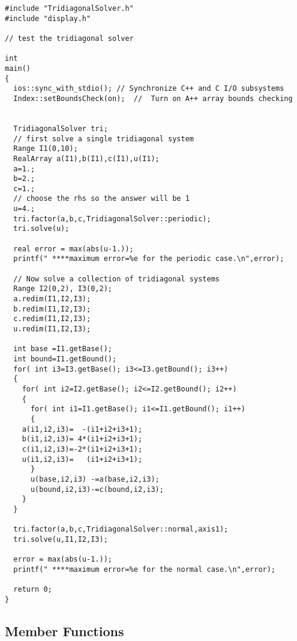 {\footnotesize
\begin{verbatim}
#include "TridiagonalSolver.h"
#include "display.h"

// test the tridiagonal solver

int
main()
{
  ios::sync_with_stdio(); // Synchronize C++ and C I/O subsystems
  Index::setBoundsCheck(on);  //  Turn on A++ array bounds checking


  TridiagonalSolver tri;
  // first solve a single tridiagonal system
  Range I1(0,10);
  RealArray a(I1),b(I1),c(I1),u(I1);
  a=1.;
  b=2.;
  c=1.;
  // choose the rhs so the answer will be 1
  u=4.;
  tri.factor(a,b,c,TridiagonalSolver::periodic);
  tri.solve(u);

  real error = max(abs(u-1.));
  printf(" ****maximum error=%e for the periodic case.\n",error);

  // Now solve a collection of tridiagonal systems
  Range I2(0,2), I3(0,2);
  a.redim(I1,I2,I3);
  b.redim(I1,I2,I3);
  c.redim(I1,I2,I3);
  u.redim(I1,I2,I3);
  
  int base =I1.getBase();
  int bound=I1.getBound();
  for( int i3=I3.getBase(); i3<=I3.getBound(); i3++)
  {
    for( int i2=I2.getBase(); i2<=I2.getBound(); i2++)
    {
      for( int i1=I1.getBase(); i1<=I1.getBound(); i1++)
      {
	a(i1,i2,i3)=  -(i1+i2+i3+1);
	b(i1,i2,i3)= 4*(i1+i2+i3+1);
	c(i1,i2,i3)=-2*(i1+i2+i3+1);
	u(i1,i2,i3)=   (i1+i2+i3+1);
      }
      u(base,i2,i3) -=a(base,i2,i3);
      u(bound,i2,i3)-=c(bound,i2,i3);
    }
  }
  
  tri.factor(a,b,c,TridiagonalSolver::normal,axis1);
  tri.solve(u,I1,I2,I3);
  
  error = max(abs(u-1.));
  printf(" ****maximum error=%e for the normal case.\n",error);

  return 0;
}
\end{verbatim}
}

\subsection{Member Functions}



